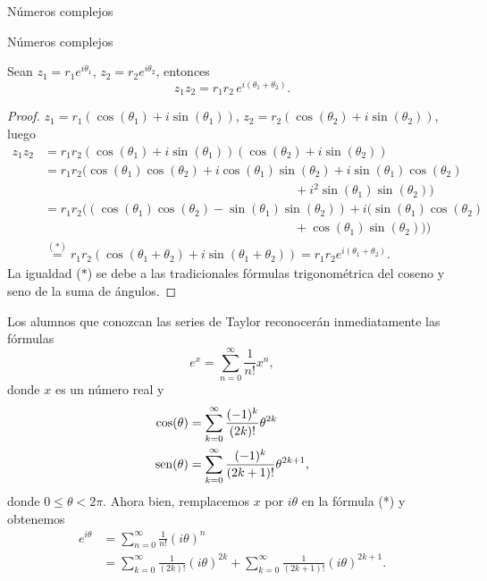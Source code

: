 \begin{chapter}{N\'umeros complejos}
\begin{section}{N\'umeros complejos}
  \begin{proposicion}
      Sean $z_1 = r_1 e^{i\theta_1}$, $z_2 = r_2 e^{i\theta_2}$,  entonces
      $$
          z_1 z_2 =  r_1r_2 \,e^{i(\theta_1+ \theta_2)}.
      $$
  \end{proposicion}
  \begin{proof}
      $z_1 = r_1(\cos(\theta_1)+i\sin(\theta_1))$, $z_2 = r_2(\cos(\theta_2)+i\sin(\theta_2))$, luego
      \begin{align*}
          z_1z_2 & = r_1r_2(\cos(\theta_1)+i\sin(\theta_1))(\cos(\theta_2)+i\sin(\theta_2))                                      \\
                 & = r_1r_2(\cos(\theta_1)\cos(\theta_2)+i\cos(\theta_1)\sin(\theta_2)+i\sin(\theta_1)\cos(\theta_2)             \\
                 & \qquad\qquad\qquad\qquad\qquad\qquad\qquad\qquad\qquad\qquad+i^2\sin(\theta_1)\sin(\theta_2))                 \\
                 & = r_1r_2((\cos(\theta_1)\cos(\theta_2)-\sin(\theta_1)\sin(\theta_2))+i(\sin(\theta_1)\cos(\theta_2)           \\
                 & \qquad\qquad\qquad\qquad\qquad\qquad\qquad\qquad \qquad\qquad +\cos(\theta_1)\sin(\theta_2)))                 \\
                 & \overset{(*)}= r_1r_2(\cos(\theta_1+\theta_2) + i\sin(\theta_1+\theta_2)) =  r_1r_2e^{i(\theta_1+ \theta_2)}.
      \end{align*}
      La igualdad ($*$) se debe a las tradicionales fórmulas trigonométrica del coseno y  seno de la suma de ángulos.
  \end{proof}


  \begin{observacion*} Los alumnos que conozcan las series de Taylor reconocerán inmediatamente las fórmulas
      \begin{equation*}
          e^x = \sum_{n=0}^{\infty} \frac{1}{n!}x^n, \tag{*}
      \end{equation*}
      donde $x$ es un número real y
      \begin{align*}
          \cos(\theta) & =  \sum_{k=0}^{\infty} \frac{(-1)^k}{(2k)!}\theta^{2k}       \\
          \operatorname{sen}(\theta) & = \sum_{k=0}^{\infty} \frac{ (-1)^k}{(2k+1)!}\theta^{2k+1} ,
      \end{align*}
      donde $0 \le \theta < 2\pi$. Ahora bien, remplacemos $x$ por $i\theta$ en la fórmula (*) y obtenemos
      \begin{align*}
          e^{i\theta} & = \sum_{n=0}^{\infty} \frac{1}{n!}(i\theta)^n                                                                           \\
                      & =  \sum_{k=0}^{\infty} \frac{1}{(2k)!}(i\theta)^{2k}  + \sum_{k=0}^{\infty} \frac{1}{(2k+1)!}(i\theta)^{2k+1}. \tag{**}
      \end{align*}


\end{observacion*}
\end{section}
\end{chapter}

